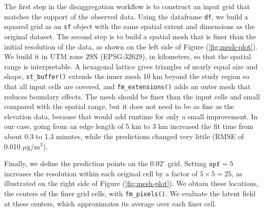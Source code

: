 The first step in the disaggregation workflow is to construct an input grid that matches the support of the observed data. Using the dataframe \texttt{df}, we build a squared grid as an \texttt{sf} object with the same spatial extent and dimensions as the original dataset. The second step is to build a spatial mesh that is finer than the initial resolution of the data, as shown on the left side of Figure (\ref{fig:mesh-plot}). We build it in UTM zone 29N (EPSG:32629), in kilometers, so that the spatial range is interpretable. A hexagonal lattice gives triangles of nearly equal size and shape, \texttt{st\_buffer()} extends the inner mesh 10 km beyond the study region so that all input cells are covered, and \texttt{fm\_extensions()} adds an outer mesh that reduces boundary effects. The mesh should be finer than the input cells and small compared with the spatial range, but it does not need to be as fine as the elevation data, because that would add runtime for only a small improvement. In our case, going from an edge length of 5 km to 3 km increased the fit time from about 0.3 to 1.3 minutes, while the predictions changed very little (RMSE of 0.010 \(\mu\)g/m\(^3\)).

Finally, we define the prediction points on the \(0.02^\circ\) grid. Setting \(\texttt{spf}=5\) increases the resolution within each original cell by a factor of \(5 \times 5 = 25\), as illustrated on the right side of Figure (\ref{fig:mesh-plot}). We obtain these locations, the centers of the finer grid cells, with \texttt{fm\_pixels()}. We evaluate the latent field at these centers, which approximates its average over each finer cell.

